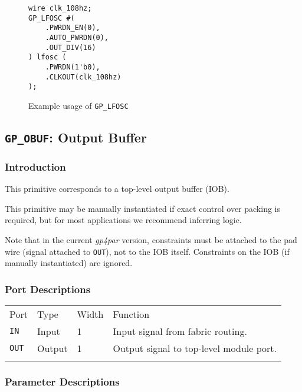\documentclass[11pt]{article}
\newcommand{\namestyle}[1]{\textit{#1}}
\newcommand{\tokenstyle}[1]{\texttt{#1}}
\newcommand{\whenstyle}[1]{{\fontseries{sb}\selectfont#1}}
\newcommand{\thinhline}{\Xhline{1\arrayrulewidth}}
\newcommand{\thickhline}{\Xhline{2.5\arrayrulewidth}}
\begin{document}
\begin{figure}[h]
\begin{lstlisting}
wire clk_108hz;
GP_LFOSC #(
	.PWRDN_EN(0),
	.AUTO_PWRDN(0),
	.OUT_DIV(16)
) lfosc (
	.PWRDN(1'b0),
	.CLKOUT(clk_108hz)
);
\end{lstlisting}
\caption{Example usage of \tokenstyle{GP\_LFOSC}}
\label{gp-lfosc-example}
\end{figure}


\pagebreak
\subsection{\tokenstyle{GP\_OBUF}: Output Buffer}
\label{gp-obuf}

\subsubsection{Introduction}
This primitive corresponds to a top-level output buffer (IOB).

This primitive may be manually instantiated if exact control over packing is required, but for most applications we
recommend inferring logic.

Note that in the current \namestyle{gp4par} version, constraints must be attached to the pad wire (signal attached to \tokenstyle{OUT}), not to the IOB itself. Constraints on the IOB (if manually instantiated) are ignored.

\subsubsection{Port Descriptions}

\begin{tabularx}{\textwidth}{lllX}
\thinhline
\whenstyle{Port} & \whenstyle{Type} & \whenstyle{Width} & \whenstyle{Function} \\
\thickhline
\tokenstyle{IN} & Input & 1 & Input signal from fabric routing. \\
\thinhline
\tokenstyle{OUT} & Output & 1 & Output signal to top-level module port. \\
\thinhline
\end{tabularx}

\subsubsection{Parameter Descriptions}
\end{document}
